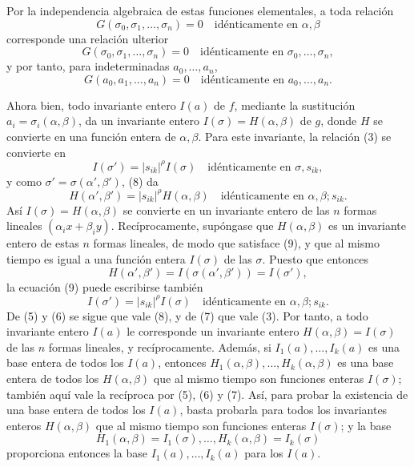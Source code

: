 \documentclass[11pt]{article}
\begin{document}
Por la independencia algebraica de estas funciones elementales, a toda relación
\begin{equation}
        G(\sigma_0,\sigma_1,\ldots,\sigma_n)=0
        \quad \text{idénticamente en \(\alpha,\beta\)}
\end{equation}
corresponde una relación ulterior
\begin{equation}
        G(\sigma_0,\sigma_1,\ldots,\sigma_n)=0
        \quad \text{idénticamente en \(\sigma_0,\ldots,\sigma_n\)},
\end{equation}
y por tanto, para indeterminadas \(a_0,\ldots,a_n\),
\begin{equation}
        G(a_0,a_1,\ldots,a_n)=0
        \quad \text{idénticamente en \(a_0,\ldots,a_n\)}.
\end{equation}

Ahora bien, todo invariante entero \(I(a)\) de \(f\), mediante la sustitución \(a_i=\sigma_i(\alpha,\beta)\), da un invariante entero \(I(\sigma)=H(\alpha,\beta)\) de \(g\), donde \(H\) se convierte en una función entera de \(\alpha,\beta\). Para este invariante, la relación (3) se convierte en
\begin{equation}
        I(\sigma')=|s_{ik}|^\rho I(\sigma)
        \quad \text{idénticamente en \(\sigma,s_{ik}\)},
\end{equation}
y como \(\sigma'=\sigma(\alpha',\beta')\), (8) da
\begin{equation}
        H(\alpha',\beta')=|s_{ik}|^\rho H(\alpha,\beta)
        \quad \text{idénticamente en \(\alpha,\beta;s_{ik}\)}.
\end{equation}
Así \(I(\sigma)=H(\alpha,\beta)\) se convierte en un invariante entero de las \(n\) formas lineales \((\alpha_i x+\beta_i y)\). Recíprocamente, supóngase que \(H(\alpha,\beta)\) es un invariante entero de estas \(n\) formas lineales, de modo que satisface (9), y que al mismo tiempo es igual a una función entera \(I(\sigma)\) de las \(\sigma\). Puesto que entonces
\[
        H(\alpha',\beta')=I(\sigma(\alpha',\beta'))=I(\sigma'),
\]
la ecuación (9) puede escribirse también
\begin{equation*}
        I(\sigma')=|s_{ik}|^\rho I(\sigma)
        \quad \text{idénticamente en \(\alpha,\beta;s_{ik}\)}.\tag{9a}
\end{equation*}
De (5) y (6) se sigue que vale (8), y de (7) que vale (3). Por tanto, a todo invariante entero \(I(a)\) le corresponde un invariante entero \(H(\alpha,\beta)=I(\sigma)\) de las \(n\) formas lineales, y recíprocamente. Además, si \(I_1(a),\ldots,I_k(a)\) es una base entera de todos los \(I(a)\), entonces \(H_1(\alpha,\beta),\ldots,H_k(\alpha,\beta)\) es una base entera de todos los \(H(\alpha,\beta)\) que al mismo tiempo son funciones enteras \(I(\sigma)\); también aquí vale la recíproca por (5), (6) y (7). Así, para probar la existencia de una base entera de todos los \(I(a)\), basta probarla para todos los invariantes enteros \(H(\alpha,\beta)\) que al mismo tiempo son funciones enteras \(I(\sigma)\); y la base
\[
        H_1(\alpha,\beta)=I_1(\sigma),\ldots,H_k(\alpha,\beta)=I_k(\sigma)
\]
proporciona entonces la base \(I_1(a),\ldots,I_k(a)\) para los \(I(a)\).
\end{document}
